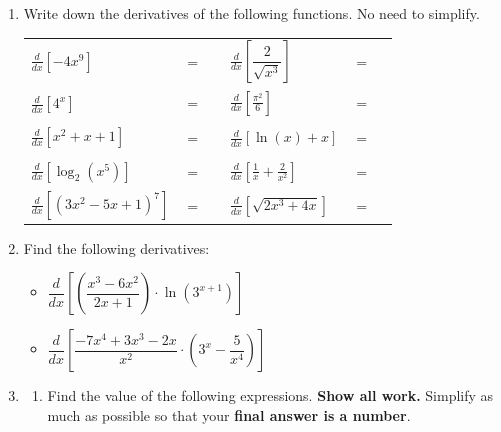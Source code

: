 \documentclass[11pt]{article}
\begin{document}
\begin{enumerate}
\item[\textbf{D3.}]
Write down the derivatives of the following functions.
No need to simplify.
\begin{center}
    \begin{tabular}{l c r l c r}
        $\displaystyle\frac{d}{dx}\left[ -4x^{9} \right]$ & $=$ & \rule[-8pt]{1.5in}{0.4pt} &
        \vspace{2cm}
        $\displaystyle\frac{d}{dx}\left[ \dfrac{2}{\sqrt{x^3}} \right]$ & $=$ & \rule[-8pt]{1.5in}{0.4pt}\\[0.3in]
        \vspace{2cm}
        $\displaystyle\frac{d}{dx}\left[ 4^x \right]$ & $=$ & \rule[-8pt]{1.5in}{0.4pt} & 
        $\displaystyle\frac{d}{dx}\left[ \frac{\pi^2}{6} \right]$ & $=$ & \rule[-8pt]{1.5in}{0.4pt}\\[0.3in]
        \vspace{2cm}
        $\displaystyle\frac{d}{dx}\left[ x^2 + x+1 \right]$ & $=$ & \rule[-8pt]{1.5in}{0.4pt}&
        $\displaystyle\frac{d}{dx}\left[ \ln(x) + x \right]$ & $=$ & \rule[-8pt]{1.5in}{0.4pt}\\[0.3in]
        \vspace{2cm}
        $\displaystyle\frac{d}{dx}\left[ \log_2(x^5) \right]$ & $=$ & \rule[-8pt]{1.5in}{0.4pt} & 
        $\displaystyle\frac{d}{dx}\left[ \frac{1}{x} + \frac{2}{x^2} \right]$ & $=$ & \rule[-8pt]{1.5in}{0.4pt}\\[0.3in]
        \vspace{2cm}

        $\displaystyle\frac{d}{dx}\left[ (3x^2-5x+1)^7 \right]$ & $=$ & \rule[-8pt]{1.5in}{0.4pt} & 
        $\displaystyle\frac{d}{dx}\left[ \sqrt{2x^3+4x} \right]$ & $=$ & \rule[-8pt]{1.5in}{0.4pt}\\[0.3in]
    \end{tabular}

\end{center}
\pagebreak
\item[\textbf{D3.}]Find the following derivatives:
\begin{itemize}
\item
$\dfrac{d}{dx} \left[ \left( \dfrac{x^3-6x^2}{2x+1} \right) \cdot \ln(3^{x+1}) \right]$
\vfill
\item 
$\dfrac{d}{dx} \left[ \dfrac{-7x^4+3x^3-2x}{x^2}\cdot \left(3^x-\dfrac{5}{x^4}\right) \right]$
\vfill
\end{itemize}
\newpage
\item[\textbf{F3.}]
\begin{enumerate}
    \item Find the value of the following expressions. \textbf{Show all work.} Simplify as much as possible so that your
    \textbf{final answer is a number}.


\end{enumerate}
\end{enumerate}
\end{document}
